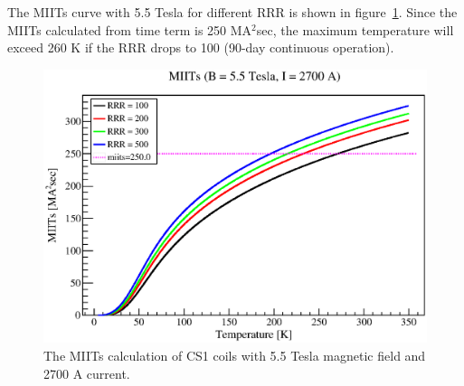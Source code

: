 The MIITs curve with 5.5 Tesla for different RRR is shown in figure~\ref{4miits}.
Since the MIITs calculated from time term is 250 MA$^2$sec, the maximum temperature will exceed 260 K if the RRR drops to 100 (90-day continuous operation).
  \begin{figure}[H]
   \centering
   \includegraphics[scale=0.48]{chapter5/fig/I2700.eps}
   \caption{ The MIITs calculation of CS1 coils with 5.5 Tesla magnetic field and 2700 A current.}
   \label{4miits}
  \end{figure}

